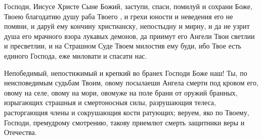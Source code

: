 \mychapterending

\begin{mymulticols}


Господи, Иисусе Христе Сыне Божий, заступи, спаси, помилуй и сохрани Боже, Твоею благодатию душу раба Твоего , и грехи юности и неведения его не помяни, и даруй ему кончину христианску, непостыдну и мирну, и да не узрит душа его мрачного взора лукавых демонов, да приимут его Ангели Твои светлии и пресветлии, и на Страшном Суде Твоем милостив ему буди, ибо Твое есть единого Господа, еже миловати и спасати нас. 

\end{mymulticols}

\mychapterending

\begin{mymulticols}


Непобедимый, непостижимый и крепкий во бранех Господи Боже наш! Ты, по неисповедимым судьбам Твоим, овому посылаеши Ангела смерти под кровом его, овому на селе, овому на мори, овомуже на поле брани от оружий бранных, изрыгающих страшныя и смертоносныя силы, разрушающия телеса, расторгающия члены и сокрушающия кости ратующих; веруем, яко по Твоему, Господи, премудрому смотрению, такову приемлют смерть защитники веры и Отечества. 


\end{mymulticols}
